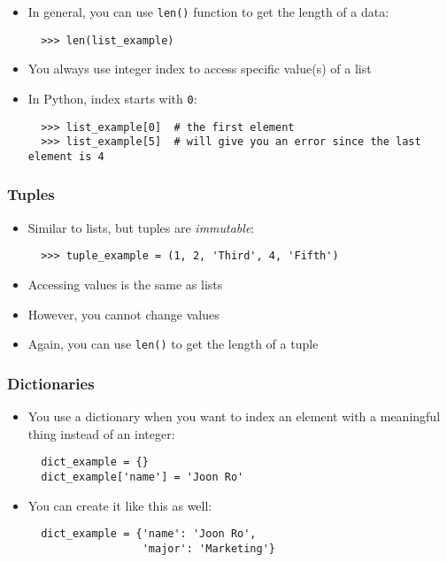\documentclass[10pt,article]{article}
\begin{document}
\begin{itemize}
\item In general, you can use \texttt{len()} function to get the length of a data:

\begin{verbatim}
  >>> len(list_example)
\end{verbatim}
\end{itemize}

\begin{itemize}
\item You always use integer index to access specific value(s) of a list
\item In Python, index starts with \texttt{0}:

\begin{verbatim}
  >>> list_example[0]  # the first element
  >>> list_example[5]  # will give you an error since the last element is 4
\end{verbatim}
\end{itemize}
\subsubsection{Tuples}
\label{sec:orgf3a91d0}
\begin{itemize}
\item Similar to lists, but tuples are \emph{immutable}:

\begin{verbatim}
  >>> tuple_example = (1, 2, 'Third', 4, 'Fifth')
\end{verbatim}

\item Accessing values is the same as lists
\item However, you cannot change values
\item Again, you can use \texttt{len()} to get the length of a tuple
\end{itemize}
\subsubsection{Dictionaries}
\label{sec:org729d7b3}
\begin{itemize}
\item You use a dictionary when you want to index an element with a meaningful thing instead of 
an integer:

\begin{verbatim}
  dict_example = {}
  dict_example['name'] = 'Joon Ro'
\end{verbatim}

\item You can create it like this as well:

\begin{verbatim}
  dict_example = {'name': 'Joon Ro',
                  'major': 'Marketing'}
\end{verbatim}
\end{itemize}
\end{document}
